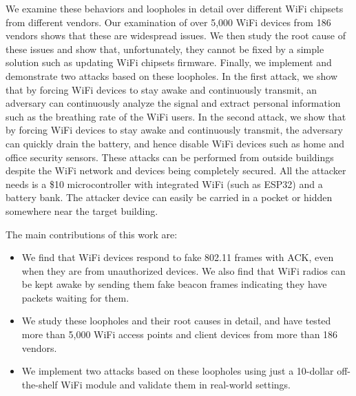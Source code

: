 We examine these behaviors and loopholes in detail over different WiFi chipsets from different vendors. Our examination of over 5,000 WiFi devices from 186 vendors shows that these are widespread issues. We then study the root cause of these issues and show that, unfortunately, they cannot be fixed by a simple solution such as updating WiFi chipsets firmware.  Finally, we implement and demonstrate two attacks based on these loopholes. In the first attack, we show that by forcing WiFi devices to stay awake and continuously transmit, an adversary can continuously analyze the signal and extract personal information such as the breathing rate of the WiFi users. In the second attack, we show that by forcing WiFi devices to stay awake and continuously transmit, the adversary can quickly drain the battery, and hence disable WiFi devices such as home and office security sensors. These attacks can be performed from outside buildings despite the WiFi network and devices being completely secured. All the attacker needs is a \$10 microcontroller with integrated WiFi (such as ESP32) and a battery bank. The attacker device can easily be carried in a pocket or hidden somewhere near the target building. 

The main contributions of this work are:
\begin{itemize}
    \item We find that WiFi devices respond to fake 802.11 frames with ACK, even when they are from unauthorized devices. We also find that WiFi radios can be kept awake by sending them fake beacon frames indicating they have packets waiting for them. 
    \item We study these loopholes and their root causes in detail, and have tested more than 5,000 WiFi access points and client devices from more than 186 vendors.  
    
    \item We implement two attacks based on these loopholes using just a 10-dollar off-the-shelf WiFi module and validate them in real-world settings.
    



    
\end{itemize}




